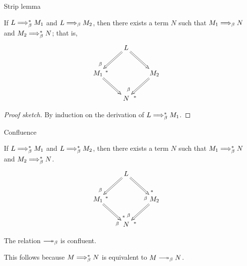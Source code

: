 \begin{frame}{Strip lemma}
  \begin{lemma}
    If $L \Longrightarrow_{\beta}^* M_1$ and $L \Longrightarrow_{\beta} M_2$, then there exists a term
    $N$ such that $M_1 \Longrightarrow_{\beta} N$ and $M_2 \Longrightarrow_{\beta}^* N$; that is,
    \[
      \xymatrix{
        & L \ar@{=>}[rd] \ar@{=>}[ld]^(.8){*}_(.8){\beta} \\
        M_1 \ar@{=>}[rd] & & M_2 \ar@{=>}[ld]^(.8){*}_(.8){\beta} \\
        & N
      }
    \]
  \end{lemma}

  \begin{proof}[Proof sketch]
    By induction on the derivation of $L \Longrightarrow_{\beta}^* M_1$.
  \end{proof}
\end{frame}

\begin{frame}{Confluence}
  \begin{theorem}
    If $L \Longrightarrow_{\beta}^* M_1$ and $L \Longrightarrow_{\beta}^* M_2$, then there exists a term
    $N$ such that $M_1 \Longrightarrow_{\beta}^* N$ and $M_2 \Longrightarrow_{\beta}^* N$.
    \[
      \xymatrix{
        & L \ar@{=>}[rd]^(.8){*}_(.8){\beta}
            \ar@{=>}[ld]^(.8){*}_(.8){\beta} \\
        M_1 \ar@{=>}[rd]^(.8){*}_(.8){\beta}
          & & M_2 \ar@{=>}[ld]^(.8){*}_(.8){\beta} \\
        & N
      }
    \]
  \end{theorem}

  \begin{corollary}
    The relation $\reduce$ is confluent.
  \end{corollary}

  This follows because $M \Longrightarrow_{\beta}^* N$ is equivalent to $M \reduce N$.
\end{frame}

%  
%  



